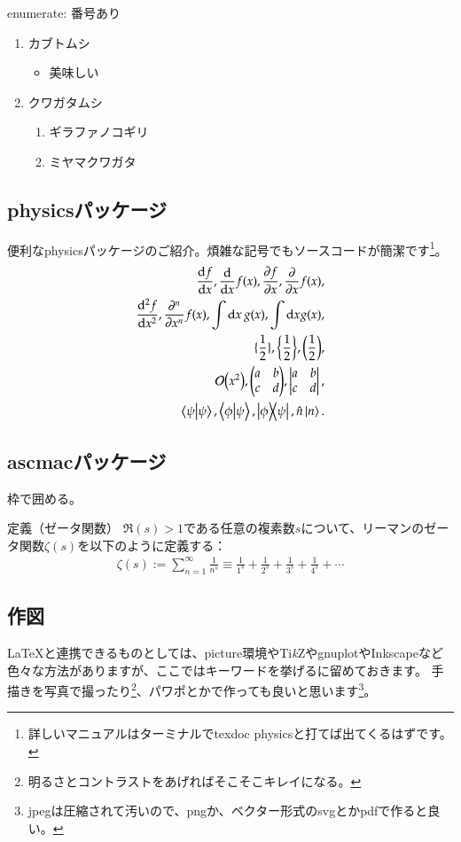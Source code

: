 \documentclass[10pt,b5paper,papersize,dvipdfmx]{jsbook}
\begin{document}
enumerate: 番号あり
\begin{enumerate}
  \item カブトムシ
  \begin{itemize}
    \item 美味しい
  \end{itemize}
  \item クワガタムシ
  \begin{enumerate}
      \item ギラファノコギリ
      \item ミヤマクワガタ
  \end{enumerate}
\end{enumerate}

%
\subsection{physicsパッケージ}
便利なphysicsパッケージのご紹介。煩雑な記号でもソースコードが簡潔です\footnote{詳しいマニュアルはターミナルで{\ttfamily texdoc physics}と打てば出てくるはずです。}。
\begin{align*}
  \dv{f}{x} (x), \dv{x} f(x), \pdv{f}{x} (x), \pdv{x} f(x),\\
  \dv[2]{f}{x} (x), \pdv[n]{x} f(x), \int \dd{x} g(x), \int \dd x g(x),\\
  \{ \frac12 \}, \qty{ \frac12 }, \qty( \frac12 ),\\
  \order{x^2}, \mqty(a & b \\ c & d), \mdet{a & b \\ c & d},\\
  \braket{\psi}, \braket{\phi}{\psi}, \ketbra{\phi}{\psi}, \hat n \ket{n}.
\end{align*}

%
\subsection{ascmacパッケージ}
枠で囲める。
\begin{itembox}[l]{定義（ゼータ関数）}
  $\Re(s) > 1$である任意の複素数$s$について、リーマンのゼータ関数$\zeta (s)$を以下のように定義する：
  \begin{align*}
    \zeta (s) := \sum_{n=1}^\infty \frac{1}{n^s}
    \equiv \frac{1}{1^s} + \frac{1}{2^s} + \frac{1}{3^s} + \frac{1}{4^s} + \cdots
  \end{align*}
\end{itembox}

%
\subsection{作図}
\LaTeX と連携できるものとしては、picture環境やTi{\itshape k}ZやgnuplotやInkscapeなど色々な方法がありますが、ここではキーワードを挙げるに留めておきます。
手描きを写真で撮ったり\footnote{明るさとコントラストをあげればそこそこキレイになる。}、パワポとかで作っても良いと思います\footnote{jpegは圧縮されて汚いので、pngか、ベクター形式のsvgとかpdfで作ると良い。}。
\end{document}

